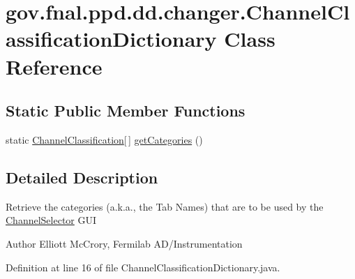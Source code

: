 \hypertarget{classgov_1_1fnal_1_1ppd_1_1dd_1_1changer_1_1ChannelClassificationDictionary}{\section{gov.\-fnal.\-ppd.\-dd.\-changer.\-Channel\-Classification\-Dictionary Class Reference}
\label{classgov_1_1fnal_1_1ppd_1_1dd_1_1changer_1_1ChannelClassificationDictionary}
}
\subsection*{Static Public Member Functions}
\begin{DoxyCompactItemize}
\item 
static \hyperlink{classgov_1_1fnal_1_1ppd_1_1dd_1_1changer_1_1ChannelClassification}{Channel\-Classification}\mbox{[}$\,$\mbox{]} \hyperlink{classgov_1_1fnal_1_1ppd_1_1dd_1_1changer_1_1ChannelClassificationDictionary_a586c766b8a6072e727bdae5d5d8c8b63}{get\-Categories} ()
\end{DoxyCompactItemize}


\subsection{Detailed Description}
Retrieve the categories (a.\-k.\-a., the Tab Names) that are to be used by the \hyperlink{classgov_1_1fnal_1_1ppd_1_1dd_1_1ChannelSelector}{Channel\-Selector} G\-U\-I

\begin{DoxyAuthor}{Author}
Elliott Mc\-Crory, Fermilab A\-D/\-Instrumentation 
\end{DoxyAuthor}


Definition at line 16 of file Channel\-Classification\-Dictionary.\-java.



